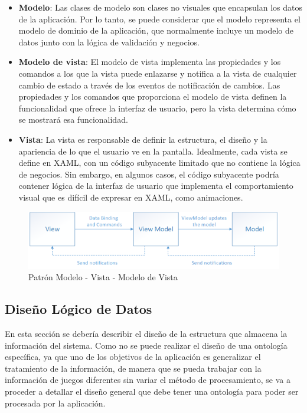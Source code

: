 \begin{itemize}

    \item \textbf{Modelo}: Las clases de modelo son clases no 
    visuales que encapsulan los datos de la aplicación. Por lo tanto, se 
    puede considerar que el modelo representa el modelo de dominio de la 
    aplicación, que normalmente incluye un modelo de datos junto con la 
    lógica de validación y negocios. 

    \item \textbf{Modelo de vista}: El modelo de vista implementa las 
    propiedades y los comandos a los que la vista puede enlazarse y notifica 
    a la vista de cualquier cambio de estado a través de los eventos de 
    notificación de cambios. Las propiedades y los comandos que proporciona 
    el modelo de vista definen la funcionalidad que ofrece la interfaz de 
    usuario, pero la vista determina cómo se mostrará esa funcionalidad.

    \item \textbf{Vista}: La vista es responsable de definir 
    la estructura, el diseño y la apariencia de lo que el usuario ve 
    en la pantalla. Idealmente, cada vista se define en XAML, con un 
    código subyacente limitado que no contiene la lógica de negocios. 
    Sin embargo, en algunos casos, el código subyacente podría contener 
    lógica de la interfaz de usuario que implementa el comportamiento 
    visual que es difícil de expresar en XAML, como animaciones.

\end{itemize}
\bigskip
\begin{figure}[htp]
    \centering
    \label{mvvm}
    \includegraphics[width=13cm]{Figures/mvvm.png}
    \caption{Patrón Modelo - Vista - Modelo de Vista}
\end{figure}

\subsection{Diseño Lógico de Datos}
En esta sección se debería describir el diseño de la estructura que almacena la información del sistema.
Como no se puede realizar el diseño de una ontología específica, ya que uno de los objetivos de la aplicación 
es generalizar el tratamiento de la información, de manera que se pueda trabajar con la información de juegos 
diferentes sin variar el método de procesamiento, se va a proceder a detallar el diseño general que debe 
tener una ontología para poder ser procesada por la aplicación. \medskip

